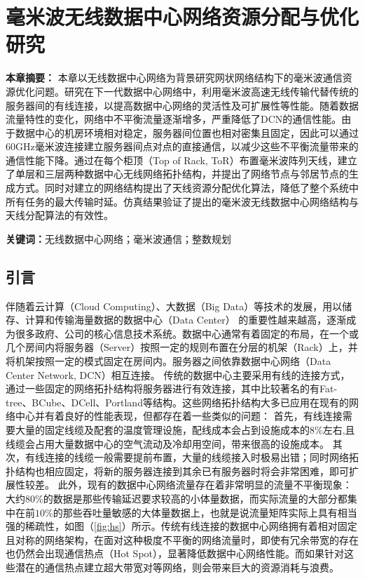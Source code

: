 \chapter{毫米波无线数据中心网络资源分配与优化研究}

\textbf{本章摘要：} 本章以无线数据中心网络为背景研究网状网络结构下的毫米波通信资源优化问题。研究在下一代数据中心网络中，利用毫米波高速无线传输代替传统的服务器间的有线连接，以提高数据中心网络的灵活性及可扩展性等性能。随着数据流量特性的变化，网络中不平衡流量逐渐增多，严重降低了DCN的通信性能。由于数据中心的机房环境相对稳定，服务器间位置也相对密集且固定，因此可以通过60GHz毫米波连接建立服务器间点对点的直接通信，以减少这些不平衡流量带来的通信性能下降。通过在每个柜顶（Top of Rack, ToR）布置毫米波阵列天线，建立了单层和三层两种数据中心无线网络拓扑结构，并提出了网络节点与邻居节点的生成方式。同时对建立的网络结构提出了天线资源分配优化算法，降低了整个系统中所有任务的最大传输时延。仿真结果验证了提出的毫米波无线数据中心网络结构与天线分配算法的有效性。

\textbf{关键词：}无线数据中心网络；毫米波通信；整数规划

\section{引言}
伴随着云计算（Cloud Computing）、大数据（Big Data）等技术的发展，用以储存、计算和传输海量数据的数据中心（Data Center） 的重要性越来越高，逐渐成为很多政府、公司的核心信息技术系统。数据中心通常有着固定的布局，在一个或几个房间内将服务器（Server）按照一定的规则布置在分层的机架（Rack）上，并将机架按照一定的模式固定在房间内。服务器之间依靠数据中心网络（Data Center Network, DCN）相互连接。
传统的数据中心主要采用有线的连接方式，通过一些固定的网络拓扑结构将服务器进行有效连接，其中比较著名的有Fat-tree\cite{al2008scalable}、BCube、DCell、Portland等结构。这些网络拓扑结构大多已应用在现有的网络中心并有着良好的性能表现，但都存在着一些类似的问题：
首先，有线连接需要大量的固定线缆及配套的温度管理设施，配线成本会占到设施成本的$8\%$左右\cite{popa2010cost},且线缆会占用大量数据中心的空气流动及冷却用空间，带来很高的设施成本。
其次，有线连接的线缆一般需要提前布置，大量的线缆接入时极易出错；同时网络拓扑结构也相应固定，将新的服务器连接到其余已有服务器时将会非常困难，即可扩展性较差。
此外，现有的数据中心网络流量存在着非常明显的流量不平衡现象\cite{benson2010network}：大约$80\%$的数据是那些传输延迟要求较高的小体量数据，而实际流量的大部分都集中在前$10\%$的那些吞吐量敏感的大体量数据上，也就是说流量矩阵实际上具有相当强的稀疏性，如图（\ref{fig:hs}）所示。传统有线连接的数据中心网络拥有着相对固定且对称的网络架构，在面对这种极度不平衡的网络流量时，即使有冗余带宽的存在也仍然会出现通信热点（Hot Spot），显著降低数据中心网络性能。而如果针对这些潜在的通信热点建立超大带宽对等网络，则会带来巨大的资源消耗与浪费。


